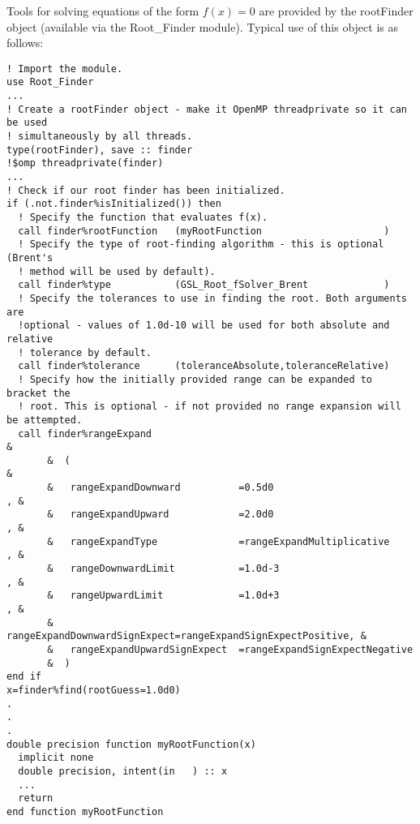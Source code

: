 Tools for solving equations of the form $f(x)=0$ are provided by the {\normalfont \ttfamily rootFinder} object (available via the {\normalfont \ttfamily Root\_Finder} module). Typical use of this object is as follows:
\begin{lstlisting}
! Import the module.
use Root_Finder
...
! Create a rootFinder object - make it OpenMP threadprivate so it can be used
! simultaneously by all threads.
type(rootFinder), save :: finder
!$omp threadprivate(finder)                                                                                                      
...
! Check if our root finder has been initialized.
if (.not.finder%isInitialized()) then
  ! Specify the function that evaluates f(x).
  call finder%rootFunction   (myRootFunction                     )
  ! Specify the type of root-finding algorithm - this is optional (Brent's
  ! method will be used by default).
  call finder%type           (GSL_Root_fSolver_Brent             )
  ! Specify the tolerances to use in finding the root. Both arguments are
  !optional - values of 1.0d-10 will be used for both absolute and relative
  ! tolerance by default.
  call finder%tolerance      (toleranceAbsolute,toleranceRelative)
  ! Specify how the initially provided range can be expanded to bracket the
  ! root. This is optional - if not provided no range expansion will be attempted.
  call finder%rangeExpand                                               & 
       &  (                                                             &
       &   rangeExpandDownward          =0.5d0                        , &
       &   rangeExpandUpward            =2.0d0                        , &
       &   rangeExpandType              =rangeExpandMultiplicative    , &
       &   rangeDownwardLimit           =1.0d-3                       , &
       &   rangeUpwardLimit             =1.0d+3                       , &
       &   rangeExpandDownwardSignExpect=rangeExpandSignExpectPositive, &
       &   rangeExpandUpwardSignExpect  =rangeExpandSignExpectNegative
       &  )
end if
x=finder%find(rootGuess=1.0d0)
.
.
.
double precision function myRootFunction(x)
  implicit none
  double precision, intent(in   ) :: x
  ...
  return
end function myRootFunction
\end{lstlisting}
